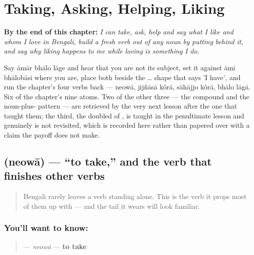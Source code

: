 
\chapter{Taking, Asking, Helping, Liking}
\label{ch:bn-conjunct-verbs}

\begin{chapteropening}
\textbf{By the end of this chapter:} \emph{I can take, ask, help and say what I like and whom I love in Bengali, build a fresh verb out of any noun by putting  behind it, and say why liking happens to me while loving is something I do.}

Say āmār bhālo lāge and hear that you are not its subject, set it against āmi bhālobāsi where you are, place both beside the  …  shape that says 'I have', and run the chapter's four verbs back — neowā, jijñāsā kôrā, sāhājjo kôrā, bhālo lāgā. Six of the chapter's nine atoms. Two of the other three — the  compound and the noun-plus- pattern — are retrieved by the very next lesson after the one that taught them; the third, the doubled  of , is taught in the penultimate lesson and genuinely is not revisited, which is recorded here rather than papered over with a claim the payoff does not make.
\end{chapteropening}

\section[neowā]{ (neowā) — \textquotedblleft{}to take,\textquotedblright{} and the verb that finishes other verbs}

\label{lesson:BN-C09-neowa}



\begin{quote}
Bengali rarely leaves a verb standing alone. This is the verb it props most of them up with — and the tail it wears will look familiar.
\end{quote}

\subsection*{You'll want to know: }
\begin{quote}
\textbf{} — \emph{neowā} — \textbf{to take}
\end{quote}

